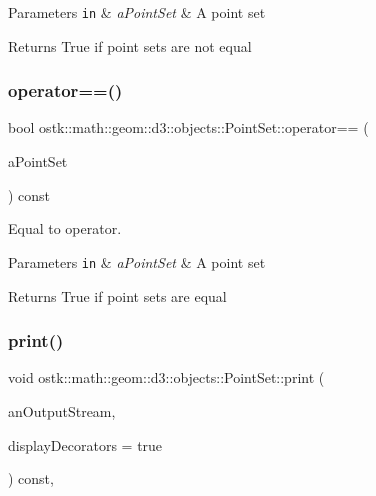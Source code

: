 \begin{DoxyParams}[1]{Parameters}
\mbox{\tt in}  & {\em a\+Point\+Set} & A point set \\
\hline
\end{DoxyParams}
\begin{DoxyReturn}{Returns}
True if point sets are not equal 
\end{DoxyReturn}
\mbox{\label{classostk_1_1math_1_1geom_1_1d3_1_1objects_1_1_point_set_a2561f42d2df2e1adf5e6417a2e7e9698}} 
\subsubsection{\texorpdfstring{operator==()}{operator==()}}
{\footnotesize\ttfamily bool ostk\+::math\+::geom\+::d3\+::objects\+::\+Point\+Set\+::operator== (\begin{DoxyParamCaption}\item[{const \hyperlink{classostk_1_1math_1_1geom_1_1d3_1_1objects_1_1_point_set}{Point\+Set} \&}]{a\+Point\+Set }\end{DoxyParamCaption}) const}



Equal to operator. 


\begin{DoxyParams}[1]{Parameters}
\mbox{\tt in}  & {\em a\+Point\+Set} & A point set \\
\hline
\end{DoxyParams}
\begin{DoxyReturn}{Returns}
True if point sets are equal 
\end{DoxyReturn}
\mbox{\label{classostk_1_1math_1_1geom_1_1d3_1_1objects_1_1_point_set_adeeac2042e2e518b51c3b8dc4365c130}} 
\subsubsection{\texorpdfstring{print()}{print()}}
{\footnotesize\ttfamily void ostk\+::math\+::geom\+::d3\+::objects\+::\+Point\+Set\+::print (\begin{DoxyParamCaption}\item[{std\+::ostream \&}]{an\+Output\+Stream,  }\item[{bool}]{display\+Decorators = {\ttfamily true} }\end{DoxyParamCaption}) const\hspace{0.3cm}{\ttfamily [override]}, {\ttfamily [virtual]}}



